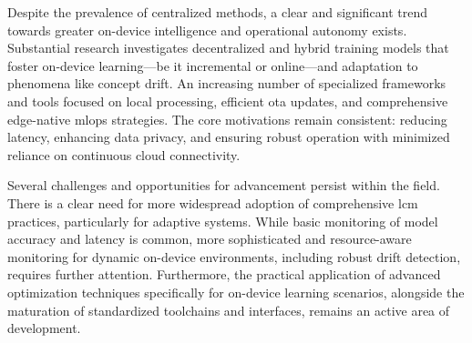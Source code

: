 Despite the prevalence of centralized methods, a clear and significant trend towards greater on-device intelligence and operational autonomy exists. Substantial research investigates decentralized and hybrid training models that foster on-device learning—be it incremental or online—and adaptation to phenomena like concept drift. An increasing number of specialized frameworks and tools focused on local processing, efficient \gls{ota} updates, and comprehensive edge-native \gls{mlops} strategies. The core motivations remain consistent: reducing latency, enhancing data privacy, and ensuring robust operation with minimized reliance on continuous cloud connectivity.

Several challenges and opportunities for advancement persist within the field. There is a clear need for more widespread adoption of comprehensive \gls{lcm} practices, particularly for adaptive systems. While basic monitoring of model accuracy and latency is common, more sophisticated and resource-aware monitoring for dynamic on-device environments, including robust drift detection, requires further attention. Furthermore, the practical application of advanced optimization techniques specifically for on-device learning scenarios, alongside the maturation of standardized toolchains and interfaces, remains an active area of development.
